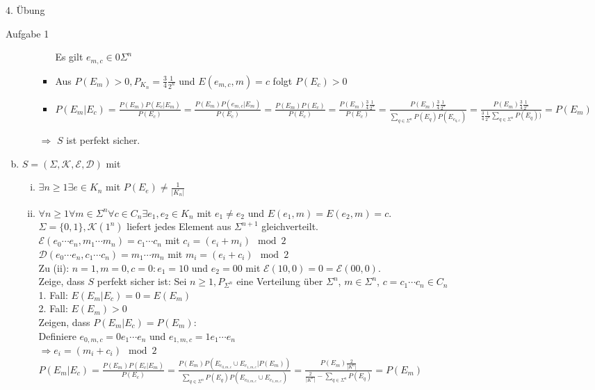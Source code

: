\begin{section}{4. Übung}
\begin{subsection}{Aufgabe 1}
\begin{enumerate}[a)]
\begin{enumerate}[(i)]
\begin{itemize}
     Es gilt $e_{m,c} \in 0\Sigma^n$
     \item Aus $P(E_m) > 0, P_{K_n} = \frac{3}{4}\frac{1}{2^n}$ und $E(e_{m,c},m) = c$ folgt $P(E_c) >0$
     \item $P(E_m|E_c) = \frac{P(E_m)P(E_c|E_m)}{P(E_c)} = \frac{P(E_m)P(e_{m,c}|E_m)}{P(E_c)} = \frac{P(E_m)P(E_c)}{P(E_c)} = \frac{P(E_m)\frac{3}{4}\frac{1}{2^n}}{P(E_c)} = \frac{P(E_m)\frac{3}{4}\frac{1}{2^n}}{\sum_{q \in \Sigma^n} P(E_q)P(E_{e_{q,c}})} = \frac{P(E_m)\frac{3}{4}\frac{1}{2^n}}{\frac{3}{4}\frac{1}{2^n}\sum_{q \in \Sigma^n} P(E_q))} = P(E_m)$
    \end{itemize}
    $\Rightarrow$ $S$ ist perfekt sicher.
    
   \end{enumerate}
  \item $S = (\Sigma, \mathcal{K}, \mathcal{E}, \mathcal{D})$ mit 
  \begin{enumerate}[(i)]
   \item $\exists n \geq 1 \exists e \in K_n$ mit $P(E_e) \neq \frac{1}{|K_n|}$
   \item $\forall n \geq 1 \forall m \in \Sigma^n \forall c \in C_n \exists e_1,e_2\in K_n$ mit $e_1 \neq e_2$ und $E(e_1,m)=E(e_2,m)=c$.\\
   $\Sigma = \{0,1\}, \mathcal{K}(1^n)$ liefert jedes Element aus $\Sigma^{n+1}$ gleichverteilt. \\
   $\mathcal{E}(e_0 \cdots e_n, m_1 \cdots m_n) = c_1 \cdots c_n$ mit $c_i = (e_i + m_i) \mod 2$\\
   $\mathcal{D}(e_0 \cdots e_n, c_1 \cdots c_n) = m_1 \cdots m_n$ mit $m_i = (e_i + c_i) \mod 2$\\
   Zu (ii): $n = 1, m = 0, c = 0: e_1 = 10$ und $e_2 = 00$ mit $\mathcal{E}(10,0) = 0 = \mathcal{E}(00,0)$.\\
   Zeige, dass $S$ perfekt sicher ist: Sei $n \geq 1, P_{\Sigma^n}$ eine Verteilung über $\Sigma^n$, $m \in \Sigma^n$, $c = c_1 \cdots c_n \in C_n$\\
   1. Fall: $E(E_m|E_c) = 0 = E(E_m)$\\
   2. Fall: $E(E_m) > 0$\\
   Zeigen, dass $P(E_m|E_c) = P(E_m)$:\\
   Definiere $e_{0,m,c} = 0e_1 \cdots e_n$ und $e_{1,m,c} = 1e_1 \cdots e_n $\\
   $\Rightarrow e_i = (m_i +c_i) \mod 2$\\
   $P(E_m|E_c) = \frac{P(E_m)P(E_c|E_m)}{P(E_c)} = \frac{P(E_m)P(E_{e_{0,m,c}} \cup E_{e_{1,m,c}}|P(E_m))}{\sum_{q \in \Sigma^n} P(E_q)P(E_{e_{0,m,c}} \cup E_{e_{1,m,c}})} = \frac{P(E_m)\frac{2}{|K^n|}}{\frac{2}{|K^n|}-\sum_{q \in \Sigma^n} P(E_q)} = P(E_m)$\\

\end{enumerate}
\end{enumerate}
\end{subsection}
\end{section}
